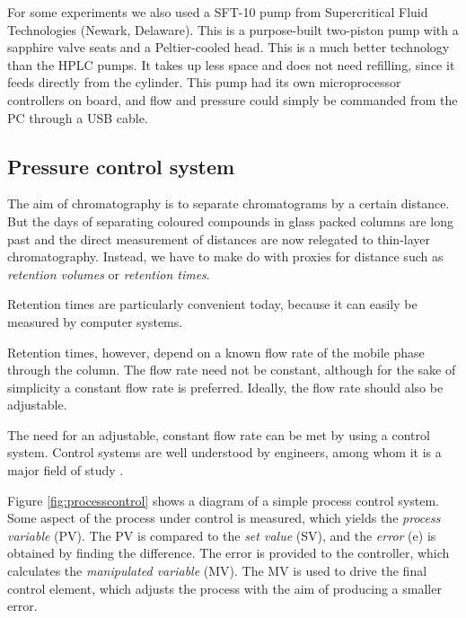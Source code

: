 For some experiments we also used a SFT-10 pump from Supercritical Fluid
Technologies (Newark, Delaware). This is a purpose-built two-piston pump with a
sapphire valve seats and a Peltier-cooled head. This is a much better technology
than the HPLC pumps. It takes up less space and does not need refilling, since
it feeds directly from the cylinder. This pump had its own microprocessor
controllers on board, and flow and pressure could simply be commanded from the
PC through a USB cable.

\subsection{Pressure control system}

The aim of chromatography is to separate chromatograms by a certain distance.
But the days of separating coloured compounds in glass packed columns are long
past and the direct measurement of distances are now relegated to thin-layer
chromatography. Instead, we have to make do with proxies for distance such as \textit{retention
volumes} or \textit{retention times}. 



Retention times are particularly convenient today, because it can easily be
measured by computer systems.

Retention times, however, depend on a known flow rate of the mobile phase
through the column. The flow rate need not be constant, although for the sake of
simplicity a constant flow rate is preferred. Ideally, the flow rate should also be
adjustable.

The need for an adjustable, constant flow rate can be met by using a control
system. Control systems are well understood by engineers, among whom it is a
major field of study \autocite{Koenig2009}. 

Figure \ref{fig:processcontrol} shows a diagram of a simple process control
system. Some aspect of the process under control is measured, which yields the
\textit{process variable} (PV). The PV is compared to the \textit{set value}
(SV), and the \textit{error} (e) is obtained by finding the difference. The error
is provided to the controller, which calculates the \textit{manipulated
variable} (MV). The MV is used to drive the final control element, which adjusts
the process with the aim of producing a smaller error.

